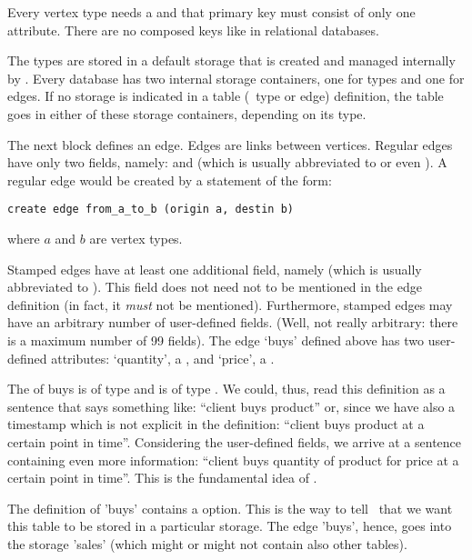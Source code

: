 Every vertex type needs a  and
that primary key must consist of only one attribute.
There are no composed keys like in relational
databases.

The types are stored in a default storage
that is created and managed internally by \nowdb.
Every database has two internal storage containers,
one for types and one for edges. If no storage
is indicated in a table (\ie\ type or edge) definition,
the table goes in either of these storage containers,
depending on its type.

The next block defines an  edge.
Edges are links between vertices. Regular edges
have only two fields, namely: 
and  (which is usually abbreviated
to  or even ).
A regular edge would be created by a statement of the form:

\begin{sqlcode}
\begin{lstlisting}
create edge from_a_to_b (origin a, destin b) 
\end{lstlisting}
\end{sqlcode}

where $a$ and $b$ are vertex types.

Stamped edges have at least one additional field,
namely  (which is usually abbreviated
to ). This field does not need not to be mentioned
in the edge definition (in fact, it \emph{must} not be
mentioned). Furthermore, stamped edges may have an
arbitrary number of user-defined fields.
(Well, not really arbitrary: there is a maximum number
of 99 fields).
The edge `buys' defined above has two user-defined
attributes: `quantity', a , and
`price', a .

The  of buys is of type
 and  is of type .
We could, thus, read this definition as a sentence
that says something like: ``client buys product'' or,
since we have also a timestamp which is not explicit
in the definition:
``client buys product at a certain point in time''.
Considering the user-defined fields,
we arrive at a sentence containing even more information:
``client buys quantity of product for price at a certain point in time''.
This is the fundamental idea of \nowdb.

The definition of 'buys' contains a  option.
This is the way to tell \nowdb\ that we want this table 
to be stored in a particular storage. The edge 'buys',
hence, goes into the storage 'sales' (which might or
might not contain also other tables).

